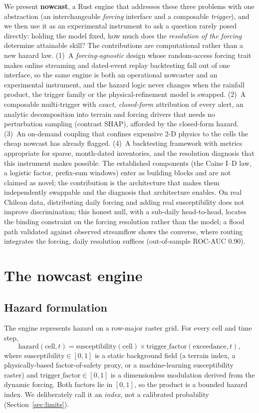 \documentclass[authoryear,preprint,review,12pt]{elsarticle}
\begin{document}
We present \textbf{nowcast}, a Rust engine that addresses these three problems
with one abstraction (an interchangeable \emph{forcing} interface and a
composable \emph{trigger}), and we then use it as an experimental instrument to
ask a question rarely posed directly: holding the model fixed, how much does the
\emph{resolution of the forcing} determine attainable skill? The contributions
are computational rather than a new hazard law. (1)~A \emph{forcing-agnostic}
design whose random-access forcing trait makes online streaming and dated-event
replay backtesting fall out of one interface, so the same engine is both an
operational nowcaster and an experimental instrument, and the hazard logic never
changes when the rainfall product, the trigger family or the physical-refinement
model is swapped. (2)~A composable multi-trigger with \emph{exact, closed-form}
attribution of every alert, an analytic decomposition into terrain and forcing
drivers that needs no perturbation sampling (contrast SHAP), afforded by the
closed-form hazard. (3)~An on-demand coupling that confines expensive 2-D physics
to the cells the cheap nowcast has already flagged. (4)~A backtesting framework
with metrics appropriate for sparse, month-dated inventories, and the resolution
diagnosis that this instrument makes possible. The established components (the
Caine I--D law, a logistic factor, prefix-sum windows) enter as building blocks
and are not claimed as novel; the contribution is the architecture that makes
them independently swappable and the diagnosis that architecture enables. On real Chilean data, distributing daily forcing and
adding real susceptibility does not improve discrimination; this honest null,
with a sub-daily head-to-head, locates the binding constraint on the forcing
resolution rather than the model; a flood path validated against observed
streamflow shows the converse, where routing integrates the forcing, daily
resolution suffices (out-of-sample ROC-AUC 0.90).

\section{The nowcast engine}

\subsection{Hazard formulation}

The engine represents hazard on a row-major raster grid. For every cell and time
step,
\begin{equation}
\mathrm{hazard}(\mathrm{cell},t)=\mathrm{susceptibility}(\mathrm{cell})\times
\mathrm{trigger\_factor}(\mathrm{exceedance},t),
\label{eq:hazard}
\end{equation}
where $\mathrm{susceptibility}\in[0,1]$ is a static background field (a terrain
index, a physically-based factor-of-safety proxy, or a machine-learning
susceptibility raster) and $\mathrm{trigger\_factor}\in[0,1]$ is a dimensionless
modulation derived from the dynamic forcing. Both factors lie in $[0,1]$, so the
product is a bounded hazard index. We deliberately call it an \emph{index}, not a
calibrated probability (Section~\ref{sec:limits}).
\end{document}
